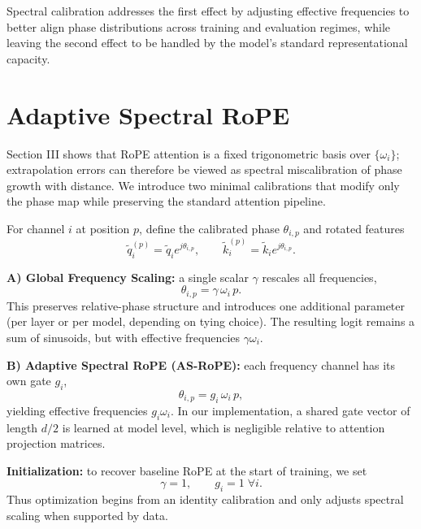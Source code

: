 \documentclass[conference]{IEEEtran}
\begin{document}
Spectral calibration addresses the first effect by adjusting effective frequencies to better align phase distributions across training and evaluation regimes, while leaving the second effect to be handled by the model's standard representational capacity.

\section{Adaptive Spectral RoPE}
Section III shows that RoPE attention is a fixed trigonometric basis over $\{\omega_i\}$; extrapolation errors can therefore be viewed as spectral miscalibration of phase growth with distance. We introduce two minimal calibrations that modify only the phase map while preserving the standard attention pipeline.

For channel $i$ at position $p$, define the calibrated phase $\theta_{i,p}$ and rotated features
\begin{equation}
\tilde q_i^{(p)} = \tilde q_i e^{j\theta_{i,p}}, \qquad
\tilde k_i^{(p)} = \tilde k_i e^{j\theta_{i,p}}.
\end{equation}

\textbf{A) Global Frequency Scaling:} a single scalar $\gamma$ rescales all frequencies,
\begin{equation}
\theta_{i,p}=\gamma\,\omega_i\,p.
\label{eq:global_gamma}
\end{equation}
This preserves relative-phase structure and introduces one additional parameter (per layer or per model, depending on tying choice). The resulting logit remains a sum of sinusoids, but with effective frequencies $\gamma\omega_i$.

\textbf{B) Adaptive Spectral RoPE (AS-RoPE):} each frequency channel has its own gate $g_i$,
\begin{equation}
\theta_{i,p}=g_i\,\omega_i\,p,
\label{eq:adaptive_gate}
\end{equation}
yielding effective frequencies $g_i\omega_i$. In our implementation, a shared gate vector of length $d/2$ is learned at model level, which is negligible relative to attention projection matrices.

\textbf{Initialization:} to recover baseline RoPE at the start of training, we set
\begin{equation}
\gamma=1, \qquad g_i=1\;\forall i.
\end{equation}
Thus optimization begins from an identity calibration and only adjusts spectral scaling when supported by data.
\end{document}
